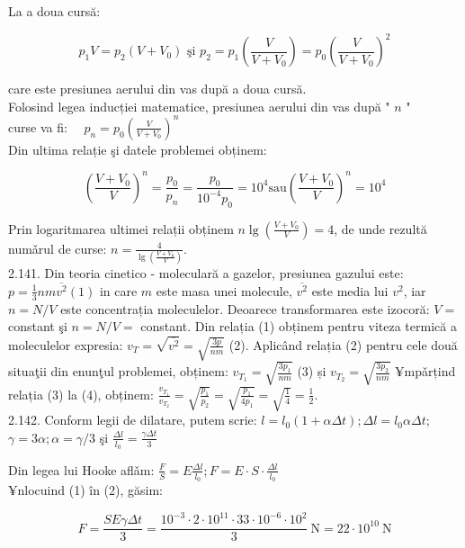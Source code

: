 \documentclass[10pt]{article}
\begin{document}
La a doua cursă:


\begin{equation*}
p_{1} V=p_{2}\left(V+V_{0}\right) \text { şi } p_{2}=p_{1}\left(\frac{V}{V+V_{0}}\right)=p_{0}\left(\frac{V}{V+V_{0}}\right)^{2} \tag{2}
\end{equation*}


care este presiunea aerului din vas după a doua cursă.\\
Folosind legea inducției matematice, presiunea aerului din vas după " $n$ "\\
curse va fi: $\quad p_{n}=p_{0}\left(\frac{V}{V+V_{0}}\right)^{n}$\\
Din ultima relație şi datele problemei obținem:

$$
\left(\frac{V+V_{0}}{V}\right)^{n}=\frac{p_{0}}{p_{n}}=\frac{p_{0}}{10^{-4} p_{0}}=10^{4} \mathrm{sau}\left(\frac{V+V_{0}}{V}\right)^{n}=10^{4}
$$

Prin logaritmarea ultimei relații obținem $n \lg \left(\frac{V+V_{0}}{V}\right)=4$, de unde rezultă numǎrul de curse: $n=\frac{4}{\lg \left(\frac{V+V_{0}}{V}\right)}$.\\
2.141. Din teoria cinetico - moleculară a gazelor, presiunea gazului este: $p=\frac{1}{3} n m \overline{v^{2}}(1)$ in care $m$ este masa unei molecule, $\overline{v^{2}}$ este media lui $v^{2}$, iar $n=N / V$ este concentrația moleculelor. Deoarece transformarea este izocoră: $V=$ constant şi $n=N / V=$ constant. Din relația (1) obținem pentru viteza termică a moleculelor expresia: $v_{T}=\sqrt{\overline{v^{2}}}=\sqrt{\frac{3 p}{n m}}$ (2). Aplicând relația (2) pentru cele două situaţii din enunţul problemei, obținem: $v_{T_{1}}=\sqrt{\frac{3 p_{1}}{n m}}$ (3) și $v_{T_{2}}=\sqrt{\frac{3 p_{2}}{n m}}$ ¥mpǎrțind relația (3) la (4), obținem: $\frac{v_{T_{1}}}{v_{T_{2}}}=\sqrt{\frac{p_{1}}{p_{2}}}=\sqrt{\frac{p_{1}}{4 p_{1}}}=\sqrt{\frac{1}{4}}=\frac{1}{2}$.\\
2.142. Conform legii de dilatare, putem scrie: $l=l_{0}(1+\alpha \Delta t) ; \Delta l=l_{0} \alpha \Delta t$; $\gamma=3 \alpha ; \alpha=\gamma / 3$ şi $\frac{\Delta l}{l_{0}}=\frac{\gamma \Delta t}{3}$

Din legea lui Hooke aflǎm: $\frac{F}{S}=E \frac{\Delta l}{l_{0}} ; F=E \cdot S \cdot \frac{\Delta l}{l_{0}}$\\
¥nlocuind (1) în (2), găsim:

$$
F=\frac{S E \gamma \Delta t}{3}=\frac{10^{-3} \cdot 2 \cdot 10^{11} \cdot 33 \cdot 10^{-6} \cdot 10^{2}}{3} \mathrm{~N}=22 \cdot 10^{10} \mathrm{~N}
$$
\end{document}
